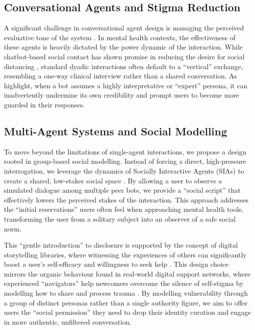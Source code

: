 \documentclass[sigconf]{acmart}
\begin{document}
\subsection{Conversational Agents and Stigma Reduction}
A significant challenge in conversational agent design is managing the perceived evaluative tone of the system \cite{Cui2024ChatbotStigma}. In mental health contexts, the effectiveness of these agents is heavily dictated by the power dynamic of the interaction. 
While chatbot-based social contact has shown promise in reducing the desire for social distancing \cite{Lee2023SocialContact}, standard dyadic interactions often default to a ``vertical'' exchange, resembling a one-way clinical interview rather than a shared conversation. 
As \citeauthor{Cui2024ChatbotStigma} \cite{Cui2024ChatbotStigma} highlight, when a bot assumes a highly interpretative or ``expert'' persona, it can inadvertently undermine its own credibility and prompt users to become more guarded in their responses. 

\subsection{Multi-Agent Systems and Social Modelling}
To move beyond the limitations of single-agent interactions, we propose a design rooted in group-based social modelling. Instead of forcing a direct, high-pressure interrogation, we leverage the dynamics of Socially Interactive Agents (SIAs) to create a shared, low-stakes social space \cite{Lugrin2021HandbookVol1, Lugrin2022HandbookVol2}. By allowing a user to observe a simulated dialogue among multiple peer bots, we provide a ``social script'' that effectively lowers the perceived stakes of the interaction. This approach addresses the ``initial reservations'' users often feel when approaching mental health tools, transforming the user from a solitary subject into an observer of a safe social norm.

This ``gentle introduction'' to disclosure is supported by the concept of digital storytelling libraries, where witnessing the experiences of others can significantly boost a user's self-efficacy and willingness to seek help \cite{Sien2025DigitalHumanLibrary}. This design choice mirrors the organic behaviour found in real-world digital support networks, where experienced ``navigators'' help newcomers overcome the silence of self-stigma by modelling how to share and process trauma \cite{Ammari2026RedditInfertility}. By modelling vulnerability through a group of distinct personas rather than a single authority figure, we aim to offer users the ``social permission'' they need to drop their identity curation and engage in more authentic, unfiltered conversation.
\end{document}
